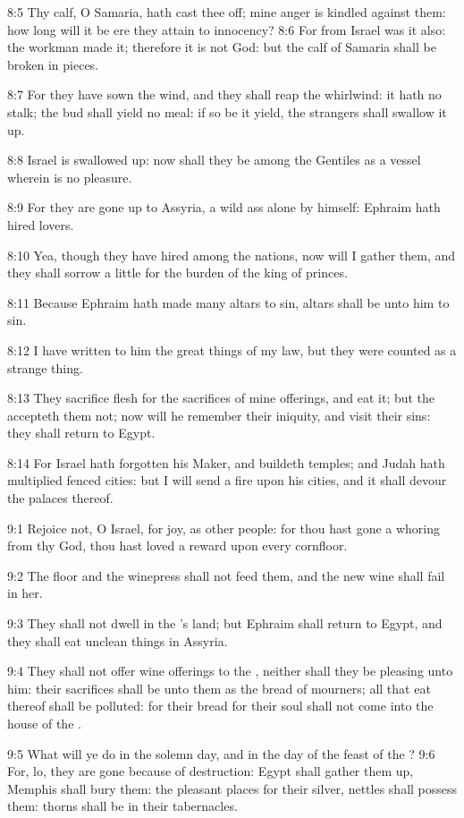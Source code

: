 8:5 Thy calf, O Samaria, hath cast thee off; mine anger is kindled
against them: how long will it be ere they attain to innocency?  8:6
For from Israel was it also: the workman made it; therefore it is not
God: but the calf of Samaria shall be broken in pieces.

8:7 For they have sown the wind, and they shall reap the whirlwind: it
hath no stalk; the bud shall yield no meal: if so be it yield, the
strangers shall swallow it up.

8:8 Israel is swallowed up: now shall they be among the Gentiles as a
vessel wherein is no pleasure.

8:9 For they are gone up to Assyria, a wild ass alone by himself:
Ephraim hath hired lovers.

8:10 Yea, though they have hired among the nations, now will I gather
them, and they shall sorrow a little for the burden of the king of
princes.

8:11 Because Ephraim hath made many altars to sin, altars shall be
unto him to sin.

8:12 I have written to him the great things of my law, but they were
counted as a strange thing.

8:13 They sacrifice flesh for the sacrifices of mine offerings, and
eat it; but the \LORD accepteth them not; now will he remember their
iniquity, and visit their sins: they shall return to Egypt.

8:14 For Israel hath forgotten his Maker, and buildeth temples; and
Judah hath multiplied fenced cities: but I will send a fire upon his
cities, and it shall devour the palaces thereof.

9:1 Rejoice not, O Israel, for joy, as other people: for thou hast
gone a whoring from thy God, thou hast loved a reward upon every
cornfloor.

9:2 The floor and the winepress shall not feed them, and the new wine
shall fail in her.

9:3 They shall not dwell in the \LORD's land; but Ephraim shall return
to Egypt, and they shall eat unclean things in Assyria.

9:4 They shall not offer wine offerings to the \LORD, neither shall
they be pleasing unto him: their sacrifices shall be unto them as the
bread of mourners; all that eat thereof shall be polluted: for their
bread for their soul shall not come into the house of the \LORD.

9:5 What will ye do in the solemn day, and in the day of the feast of
the \LORD?  9:6 For, lo, they are gone because of destruction: Egypt
shall gather them up, Memphis shall bury them: the pleasant places for
their silver, nettles shall possess them: thorns shall be in their
tabernacles.

